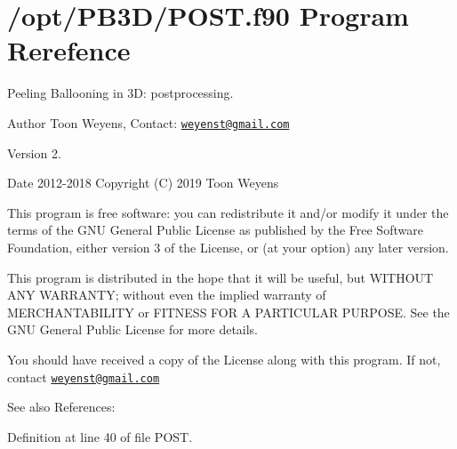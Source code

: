 \hypertarget{POST_8f90}{}\section{/opt/\+P\+B3\+D/\+P\+O\+ST.f90 Program Rerefence}
\label{POST_8f90}



Peeling Ballooning in 3D\+: postprocessing. 

\begin{DoxyAuthor}{Author}
Toon Weyens, Contact\+: \href{mailto:weyenst@gmail.com}{\tt weyenst@gmail.\+com} 
\end{DoxyAuthor}
\begin{DoxyVersion}{Version}
2. 
\end{DoxyVersion}
\begin{DoxyDate}{Date}
2012-\/2018 Copyright (C) 2019 Toon Weyens
\end{DoxyDate}
This program is free software\+: you can redistribute it and/or modify it under the terms of the G\+NU General Public License as published by the Free Software Foundation, either version 3 of the License, or (at your option) any later version.

This program is distributed in the hope that it will be useful, but W\+I\+T\+H\+O\+UT A\+NY W\+A\+R\+R\+A\+N\+TY; without even the implied warranty of M\+E\+R\+C\+H\+A\+N\+T\+A\+B\+I\+L\+I\+TY or F\+I\+T\+N\+E\+SS F\+OR A P\+A\+R\+T\+I\+C\+U\+L\+AR P\+U\+R\+P\+O\+SE. See the G\+NU General Public License for more details.

You should have received a copy of the License along with this program. If not, contact \href{mailto:weyenst@gmail.com}{\tt weyenst@gmail.\+com} \begin{DoxySeeAlso}{See also}
References\+: \cite{weyens2014theory} \cite{Weyens2017PB3D} 
\end{DoxySeeAlso}


Definition at line 40 of file P\+O\+S\+T.

